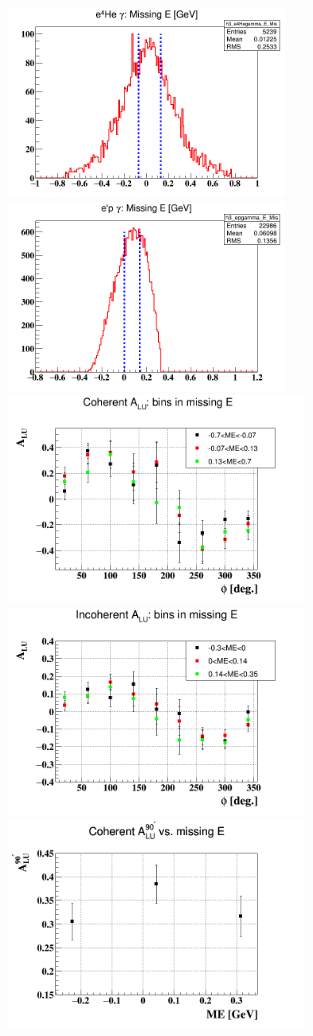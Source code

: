 \begin{figure}[h!]
   \includegraphics[height=5.0cm]{fig/coh_ME_bins.png}
   \includegraphics[height=5.0cm]{fig/incoh_ME_bins.png}
   \includegraphics[height=5.5cm]{fig/BSA_coherent_ME.png}
   \includegraphics[height=5.5cm]{fig/BSA_incoherent_ME.png}
   \includegraphics[height=5.5cm]{fig/coh_ME_alpha.png}

\end{figure}
